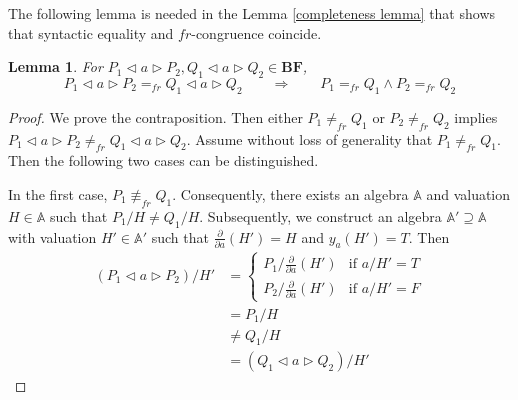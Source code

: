 \documentclass[a4paper,twoside,openright]{report}
\newcommand{\dd}[1]{\frac{\partial}{\partial #1}}
\newcommand{\BF}{\ensuremath{\textbf{BF}}}
\newcommand{\lef}{\ensuremath{\triangleleft}}
\newcommand{\rig}{\ensuremath{\triangleright}}
\newtheorem{lem}[theorem]{Lemma}
\begin{document}
The following lemma is needed in the Lemma \ref{completeness lemma} that shows that syntactic equality and $fr$-congruence coincide.
\begin{lem}\label{inv congr lemma}
For $P_1\lef a\rig P_2, Q_1\lef a\rig Q_2\in\BF$,
\[
P_1\lef a\rig P_2=_{fr}Q_1\lef a\rig Q_2\qquad\Longrightarrow\qquad P_1=_{fr} Q_1\wedge P_2=_{fr} Q_2
\]
\end{lem}
\begin{proof}
We prove the contraposition. Then either $P_1\ne_{fr}Q_1$ or $P_2\ne_{fr}Q_2$ implies $P_1\lef a\rig P_2\ne_{fr}Q_1\lef a\rig Q_2$. Assume without loss of generality that $P_1\ne_{fr}Q_1$. Then the following two cases can be distinguished.

In the first case, $P_1\not\equiv_{fr} Q_1$. Consequently, there exists an algebra $\mathbb{A}$ and valuation $H\in\mathbb{A}$ such that $P_1/H\ne Q_1/H$. Subsequently, we construct an algebra $\mathbb{A'}\supseteq\mathbb{A}$ with valuation $H'\in\mathbb{A'}$ such that $\dd a(H')=H$ and $y_a(H')=T$. Then
\begin{align*}
(P_1\lef a\rig P_2)/H'
&=\begin{cases}
P_1/\dd a(H') & \text{if $a/H'=T$}\\
P_2/\dd a(H') & \text{if $a/H'=F$}
\end{cases}\\
&=P_1/H\\
&\ne Q_1/H\\
&=(Q_1\lef a\rig Q_2)/H'
\end{align*}


\end{proof}
\end{document}
